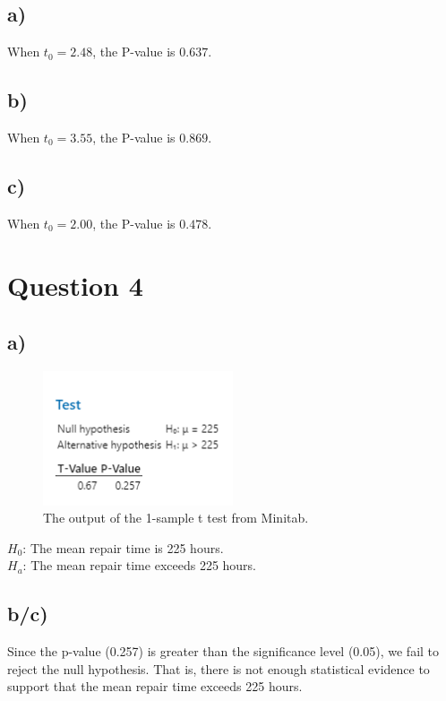 \documentclass{article}
\begin{document}
\subsection*{a)}
When $t_0 = 2.48$, the P-value is $0.637$.
\subsection*{b)}
When $t_0 = 3.55$, the P-value is $0.869$.
\subsection*{c)}
When $t_0 = 2.00$, the P-value is $0.478$.

\section*{Question 4}

\subsection*{a)}

\begin{figure}[h]
    \centering
    \includegraphics[width=0.5\textwidth]{./hw_1/images/4_b.png}
    \caption{The output of the 1-sample t test from Minitab.}
    \label{fig:4_a}
  \end{figure}
\begin{flushleft}
    $H_0$: The mean repair time is 225 hours. \\
    $H_a$: The mean repair time exceeds 225 hours.
\end{flushleft}
\subsection*{b/c)}
Since the p-value (0.257)
is greater than the significance level (0.05),
we fail to reject the null hypothesis. That is,
there is not enough statistical evidence to support that the mean repair
time exceeds 225 hours.
\end{document}
